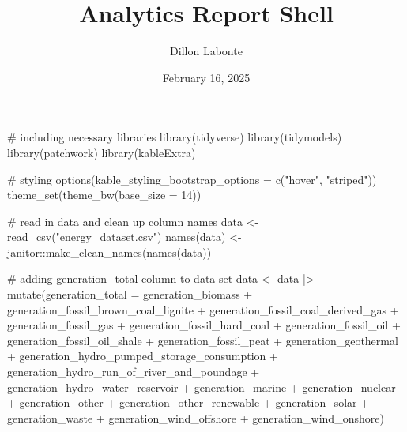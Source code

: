 \documentclass[
]{article}
\title{Analytics Report Shell}
\author{Dillon Labonte}
\date{February 16, 2025}
\newenvironment{Shaded}{\begin{snugshade}}{\end{snugshade}}
\newcommand{\AttributeTok}[1]{\textcolor[rgb]{0.40,0.45,0.13}{#1}}
\newcommand{\CommentTok}[1]{\textcolor[rgb]{0.37,0.37,0.37}{#1}}
\newcommand{\DecValTok}[1]{\textcolor[rgb]{0.68,0.00,0.00}{#1}}
\newcommand{\FunctionTok}[1]{\textcolor[rgb]{0.28,0.35,0.67}{#1}}
\newcommand{\NormalTok}[1]{\textcolor[rgb]{0.00,0.23,0.31}{#1}}
\newcommand{\OtherTok}[1]{\textcolor[rgb]{0.00,0.23,0.31}{#1}}
\newcommand{\SpecialCharTok}[1]{\textcolor[rgb]{0.37,0.37,0.37}{#1}}
\newcommand{\StringTok}[1]{\textcolor[rgb]{0.13,0.47,0.30}{#1}}
\renewcommand*\contentsname{Table of contents}
\newcommand\contentsname{Table of contents}
\begin{document}
\maketitle

\renewcommand*\contentsname{Table of contents}
{
\hypersetup{linkcolor=}
\setcounter{tocdepth}{3}
\tableofcontents
}

\begin{Shaded}
\begin{Highlighting}[]
\CommentTok{\# including necessary libraries}
\FunctionTok{library}\NormalTok{(tidyverse)}
\FunctionTok{library}\NormalTok{(tidymodels)}
\FunctionTok{library}\NormalTok{(patchwork)}
\FunctionTok{library}\NormalTok{(kableExtra)}

\CommentTok{\# styling}
\FunctionTok{options}\NormalTok{(}\AttributeTok{kable\_styling\_bootstrap\_options =} \FunctionTok{c}\NormalTok{(}\StringTok{"hover"}\NormalTok{, }\StringTok{"striped"}\NormalTok{))}
\FunctionTok{theme\_set}\NormalTok{(}\FunctionTok{theme\_bw}\NormalTok{(}\AttributeTok{base\_size =} \DecValTok{14}\NormalTok{))}

\CommentTok{\# read in data and clean up column names}
\NormalTok{data }\OtherTok{\textless{}{-}} \FunctionTok{read\_csv}\NormalTok{(}\StringTok{"energy\_dataset.csv"}\NormalTok{)}
\FunctionTok{names}\NormalTok{(data) }\OtherTok{\textless{}{-}}\NormalTok{ janitor}\SpecialCharTok{::}\FunctionTok{make\_clean\_names}\NormalTok{(}\FunctionTok{names}\NormalTok{(data))}

\CommentTok{\# adding generation\_total column to data set}
\NormalTok{data }\OtherTok{\textless{}{-}}\NormalTok{ data }\SpecialCharTok{|\textgreater{}}
  \FunctionTok{mutate}\NormalTok{(}\AttributeTok{generation\_total =}\NormalTok{ generation\_biomass }\SpecialCharTok{+}\NormalTok{ generation\_fossil\_brown\_coal\_lignite }\SpecialCharTok{+}\NormalTok{ generation\_fossil\_coal\_derived\_gas }\SpecialCharTok{+}\NormalTok{ generation\_fossil\_gas }\SpecialCharTok{+}\NormalTok{ generation\_fossil\_hard\_coal }\SpecialCharTok{+}\NormalTok{ generation\_fossil\_oil }\SpecialCharTok{+}\NormalTok{ generation\_fossil\_oil\_shale }\SpecialCharTok{+}\NormalTok{ generation\_fossil\_peat }\SpecialCharTok{+}\NormalTok{ generation\_geothermal }\SpecialCharTok{+}\NormalTok{ generation\_hydro\_pumped\_storage\_consumption }\SpecialCharTok{+}\NormalTok{ generation\_hydro\_run\_of\_river\_and\_poundage }\SpecialCharTok{+}\NormalTok{ generation\_hydro\_water\_reservoir }\SpecialCharTok{+}\NormalTok{ generation\_marine }\SpecialCharTok{+}\NormalTok{ generation\_nuclear }\SpecialCharTok{+}\NormalTok{ generation\_other }\SpecialCharTok{+}\NormalTok{ generation\_other\_renewable }\SpecialCharTok{+}\NormalTok{ generation\_solar }\SpecialCharTok{+}\NormalTok{ generation\_waste }\SpecialCharTok{+}\NormalTok{ generation\_wind\_offshore }\SpecialCharTok{+}\NormalTok{ generation\_wind\_onshore)}


\end{Highlighting}
\end{Shaded}
\end{document}
